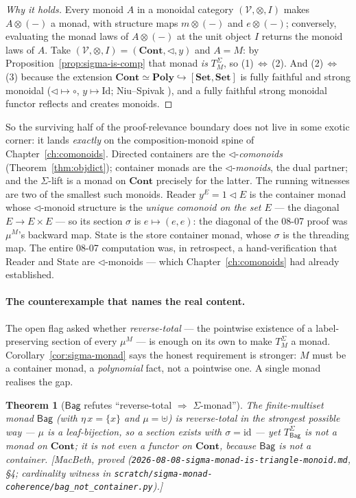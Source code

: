 \documentclass[11pt,a4paper]{book}
\newcommand{\Set}{\mathbf{Set}}
\newcommand{\Cont}{\mathbf{Cont}}
\newcommand{\Poly}{\mathbf{Poly}}
\newcommand{\y}{y}
\newcommand{\cont}[2]{#1 \triangleleft #2}
\newcommand{\id}{\mathrm{id}}
\theoremstyle{plain}
\newtheorem{Theorem}{Theorem}[chapter]
\theoremstyle{definition}
\theoremstyle{remark}
\newcommand{\prov}[1]{\hfill\textsf{\footnotesize[#1]}}
\begin{document}
\begin{proof}[Why it holds]
Every monoid $A$ in a monoidal category $(\mathcal V,\otimes,I)$ makes $A\otimes(-)$ a monad, with
structure maps $m\otimes(-)$ and $e\otimes(-)$; conversely, evaluating the monad laws of $A\otimes(-)$
at the unit object $I$ returns the monoid laws of $A$. Take $(\mathcal V,\otimes,I)=(\Cont,\triangleleft,\y)$
and $A=M$: by Proposition~\ref{prop:sigma-is-comp} that monad \emph{is} $T^{\Sigma}_{M}$, so
(1)\,$\Leftrightarrow$\,(2). And (2)\,$\Leftrightarrow$\,(3) because the extension
$\Cont\simeq\Poly\hookrightarrow[\Set,\Set]$ is fully faithful and strong monoidal
($\triangleleft\mapsto\circ$, $\y\mapsto\mathrm{Id}$; Niu--Spivak \cite{NiuSpivak23}), and a fully
faithful strong monoidal functor reflects and creates monoids.
\end{proof}

So the surviving half of the proof-relevance boundary does not live in some exotic corner: it lands
\emph{exactly} on the composition-monoid spine of Chapter~\ref{ch:comonoids}. Directed containers are
the $\triangleleft$-\emph{comonoids} (Theorem~\ref{thm:objdict}); container monads are the
$\triangleleft$-\emph{monoids}, the dual partner; and the $\Sigma$-lift is a monad on $\Cont$ precisely
for the latter. The running witnesses are two of the smallest such monoids. Reader $y^{E}=\cont 1 E$
is the container monad whose $\triangleleft$-monoid structure is the \emph{unique comonoid on the set
$E$} --- the diagonal $E\to E\times E$ --- so its section $\sigma$ is $e\mapsto(e,e)$: the diagonal of
the 08-07 proof was $\mu^{M}$'s backward map. State is the store container monad, whose $\sigma$ is the
threading map. The entire 08-07 computation was, in retrospect, a hand-verification that Reader and
State are $\triangleleft$-monoids --- which Chapter~\ref{ch:comonoids} had already established.

\paragraph{The counterexample that names the real content.} The open flag asked whether
\emph{reverse-total} --- the pointwise existence of a label-preserving section of every $\mu^{M}$ ---
is enough on its own to make $T^{\Sigma}_{M}$ a monad. Corollary~\ref{cor:sigma-monad} says the honest
requirement is stronger: $M$ must be a container monad, a \emph{polynomial} fact, not a pointwise one.
A single monad realises the gap.

\begin{Theorem}[$\mathsf{Bag}$ refutes ``reverse-total $\Rightarrow$ $\Sigma$-monad'']\label{thm:bag-refutes}
The finite-multiset monad $\mathsf{Bag}$ (with $\eta\,x=\{x\}$ and $\mu=\uplus$) is reverse-total in
the strongest possible way --- $\mu$ is a leaf-\emph{bijection}, so a section exists with $\sigma=\id$
--- yet $T^{\Sigma}_{\mathsf{Bag}}$ is \emph{not a monad on $\Cont$}; it is not even a functor on
$\Cont$, because $\mathsf{Bag}$ is not a container.
\prov{MacBeth, proved (\texttt{2026-08-08-sigma-monad-is-triangle-monoid.md}, \S4; cardinality witness
in \texttt{scratch/sigma-monad-coherence/bag\_not\_container.py}).}
\end{Theorem}
\end{document}
